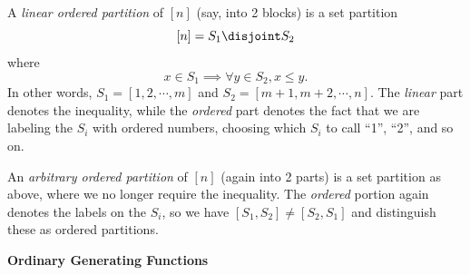A \emph{linear ordered partition} of \([n]\) (say, into 2 blocks) is a
set partition \[[n] = S_1 \disjoint S_2\] where
\[x\in S_1 \implies \forall y\in S_2, x \leq y.\] In other words,
\(S_1 = [1, 2, \cdots, m]\) and \(S_2 = [m+1, m+2, \cdots, n]\). The
\emph{linear} part denotes the inequality, while the \emph{ordered} part
denotes the fact that we are labeling the \(S_i\) with ordered numbers,
choosing which \(S_i\) to call ``1'', ``2'', and so on.

An \emph{arbitrary ordered partition} of \([n]\) (again into 2 parts) is
a set partition as above, where we no longer require the inequality. The
\emph{ordered} portion again denotes the labels on the \(S_i\), so we
have \([S_1, S_2] \neq [S_2, S_1]\) and distinguish these as ordered
partitions.

\textbf{Ordinary Generating Functions}

